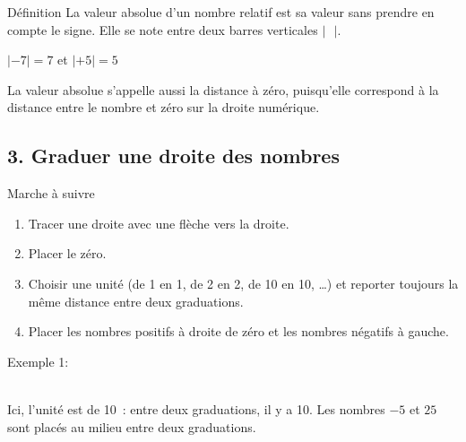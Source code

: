 \vspace{20pt}
\begin{regle}{Définition}
La \textcolor{themeNO}{valeur absolue} d'un nombre relatif est sa valeur sans prendre en compte le signe. Elle se note entre deux barres verticales $\lvert\ \ \ \rvert$.
\end{regle}

\begin{center}
$\lvert -7\rvert=7$ \quad\quad et \quad\quad $\lvert +5\rvert=5$
\end{center}

\vspace{20pt}
La valeur absolue s'appelle aussi la \textcolor{themeNO}{distance à zéro}, puisqu'elle correspond à la distance entre le nombre et zéro sur la droite numérique.

\newpage
\subsection*{3. Graduer une droite des nombres}

\begin{astuce}{Marche à suivre}
\begin{enumerate}[leftmargin=*, itemsep=2pt, topsep=2pt]
    \item Tracer une droite avec une flèche vers la droite.
    \item Placer le \textcolor{themeNO}{zéro}.
    \item Choisir une \textcolor{themeNO}{unité} (de 1 en 1, de 2 en 2, de 10 en 10, \ldots) et reporter toujours la même distance entre deux graduations.
    \item Placer les nombres positifs à droite de zéro et les nombres négatifs à gauche.
\end{enumerate}
\end{astuce}

\vspace{10pt}
Exemple 1: 

\begin{center}
\\[6pt]
Ici, l'unité est de 10~: entre deux graduations, il y a 10. Les nombres $-5$ et $25$ sont placés au milieu entre deux graduations.
\end{center}

